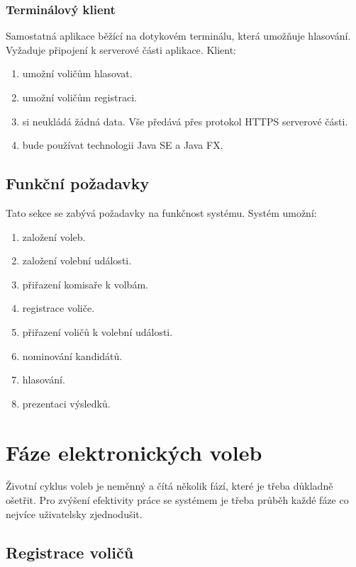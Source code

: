 \documentclass[11pt,twoside,a4paper]{book}
\begin{document}
\subsubsection{Terminálový klient}

Samostatná aplikace běžící na dotykovém terminálu, která umožňuje hlasování. Vyžaduje připojení k serverové části aplikace. Klient:

\begin{enumerate}
	\item umožní voličům hlasovat.
	\item umožní voličům registraci.
	\item si neukládá žádná data. Vše předává přes protokol HTTPS serverové části. 
	\item bude používat technologii Java SE a Java FX.
\end{enumerate}

\subsection{Funkční požadavky}

Tato sekce se zabývá požadavky na funkčnost systému. Systém umožní:

\begin{enumerate}
	\item založení voleb.
	\item založení volební události.
	\item přiřazení komisaře k volbám.
	\item registrace voliče.
	\item přiřazení voličů k volební události.
	\item nominování kandidátů.
	\item hlasování.
	\item prezentaci výsledků.
\end{enumerate}

\section{Fáze elektronických voleb}

Životní cyklus voleb je neměnný a čítá několik fází, které je třeba důkladně ošetřit. Pro zvýšení efektivity práce se systémem je třeba průběh každé fáze co nejvíce uživatelsky zjednodušit.

\subsection{Registrace voličů}
\end{document}
